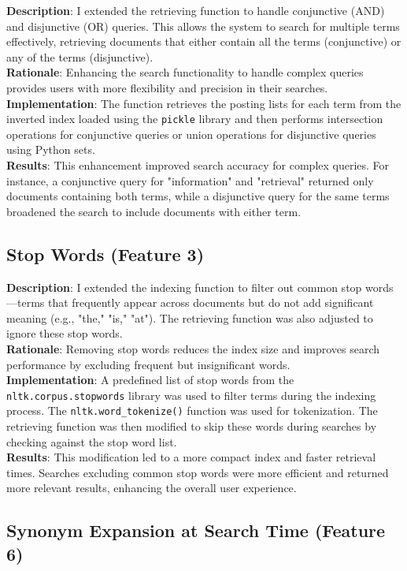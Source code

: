 \documentclass[a4paper,10pt]{article}
\begin{document}
\textbf{Description}: I extended the retrieving function to handle conjunctive (AND) and disjunctive (OR) queries. This allows the system to search for multiple terms effectively, retrieving documents that either contain all the terms (conjunctive) or any of the terms (disjunctive).\\
\textbf{Rationale}: Enhancing the search functionality to handle complex queries provides users with more flexibility and precision in their searches.\\
\textbf{Implementation}: The function retrieves the posting lists for each term from the inverted index loaded using the \texttt{pickle} library and then performs intersection operations for conjunctive queries or union operations for disjunctive queries using Python sets.\\
\textbf{Results}: This enhancement improved search accuracy for complex queries. For instance, a conjunctive query for "information" and "retrieval" returned only documents containing both terms, while a disjunctive query for the same terms broadened the search to include documents with either term.

\subsection{Stop Words (Feature 3)}

\textbf{Description}: I extended the indexing function to filter out common stop words—terms that frequently appear across documents but do not add significant meaning (e.g., "the," "is," "at"). The retrieving function was also adjusted to ignore these stop words.\\
\textbf{Rationale}: Removing stop words reduces the index size and improves search performance by excluding frequent but insignificant words.\\
\textbf{Implementation}: A predefined list of stop words from the \texttt{nltk.corpus.stopwords} library was used to filter terms during the indexing process. The \texttt{nltk.word\_tokenize()} function was used for tokenization. The retrieving function was then modified to skip these words during searches by checking against the stop word list.\\
\textbf{Results}: This modification led to a more compact index and faster retrieval times. Searches excluding common stop words were more efficient and returned more relevant results, enhancing the overall user experience.

\subsection{Synonym Expansion at Search Time (Feature 6)}
\end{document}
